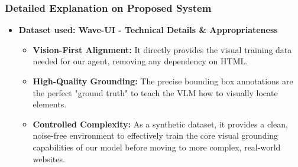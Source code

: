 
\begin{frame}
\frametitle{ Detailed Explanation on Proposed System}

\begin{itemize}
    \item \textbf{Dataset used: Wave-UI - Technical Details \& Appropriateness}
    
    \vspace{0.3cm}
    
    \begin{itemize}
        \item \textbf{Vision-First Alignment:} It directly provides the visual training data needed for our agent, removing any dependency on HTML.
        
        \vspace{0.3cm}
        
        \item \textbf{High-Quality Grounding:} The precise bounding box annotations are the perfect "ground truth" to teach the VLM how to visually locate elements.
        
        \vspace{0.3cm}
        
        \item \textbf{Controlled Complexity:} As a synthetic dataset, it provides a clean, noise-free environment to effectively train the core visual grounding capabilities of our model before moving to more complex, real-world websites.
    \end{itemize}

\end{itemize}

\end{frame}